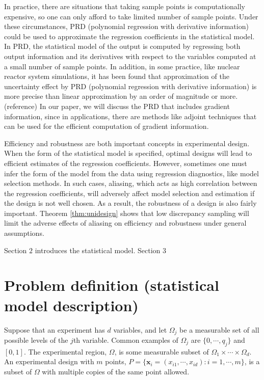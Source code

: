 \documentclass[preprint,12pt]{elsarticle}
\begin{document}
In practice, there are situations that taking sample points is
computationally expensive, so one can only afford to take limited
number of sample points. Under these circumstances, PRD (polynomial
regression with derivative information) could be used to approximate
the regression coefficients in the statistical model. In PRD, the
statistical model of the output is computed by regressing both
output information and its derivatives with respect to the variables
computed at a small number of sample points. In addition, in some
practice, like nuclear reactor system simulations, it has been found
that approximation of the uncertainty effect by PRD (polynomial
regression with derivative information) is more precise than linear
approximation by an order of magnitude or more. (reference) In our
paper, we will discuss the PRD that includes gradient information,
since in applications, there are methods like adjoint techniques
that can be used for the efficient computation of gradient
information.

Efficiency and robustness are both important concepts in
experimental design. When the form of the statistical model is
specified, optimal designs will lead to efficient estimates of the
regression coefficients. However, sometimes one must infer the form
of the model from the data using regression diagnostics, like model
selection methods. In such cases, aliasing, which acts as high
correlation between the regression coefficients, will adversely
affect model selection and estimation if the design is not well
chosen. As a result, the robustness of a design is also fairly
important. Theorem \ref{thm:unidesign} shows that low discrepancy
sampling will limit the adverse effects of aliasing on efficiency
and robustness under general assumptions.

Section $2$ introduces the statistical model. Section $3$

\section{Problem definition (statistical model description)}
\label{section:statmodel}

Suppose that an experiment has $d$ variables, and let $\Omega_j$ be
a measurable set of all possible levels of the $j$th variable.
Common examples of $\Omega_j$ are $\{0,\cdots,q_j\}$ and $[0,1]$.
The experimental region, $\Omega$, is some measurable subset of
$\Omega_1\times\cdots\times\Omega_d$. An experimental design with
$m$ points, $P=\{\boldsymbol{x}_i=(x_{i1},\cdots,x_{id}):
i=1,\cdots, m\}$, is a subset of $\Omega$ with multiple copies of
the same point allowed.
\end{document}
